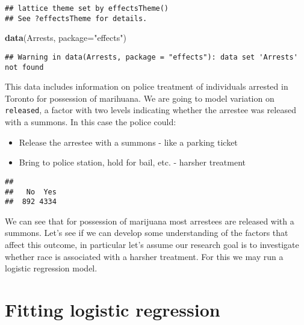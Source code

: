 \documentclass[
]{book}
\newenvironment{Shaded}{\begin{snugshade}}{\end{snugshade}}
\newcommand{\AttributeTok}[1]{\textcolor[rgb]{0.13,0.29,0.53}{#1}}
\newcommand{\FunctionTok}[1]{\textcolor[rgb]{0.13,0.29,0.53}{\textbf{#1}}}
\newcommand{\NormalTok}[1]{#1}
\newcommand{\SpecialCharTok}[1]{\textcolor[rgb]{0.81,0.36,0.00}{\textbf{#1}}}
\newcommand{\StringTok}[1]{\textcolor[rgb]{0.31,0.60,0.02}{#1}}
\begin{document}
\begin{verbatim}
## lattice theme set by effectsTheme()
## See ?effectsTheme for details.
\end{verbatim}

\begin{Shaded}
\begin{Highlighting}[]
\FunctionTok{data}\NormalTok{(Arrests, }\AttributeTok{package=}\StringTok{"effects"}\NormalTok{)}
\end{Highlighting}
\end{Shaded}

\begin{verbatim}
## Warning in data(Arrests, package = "effects"): data set 'Arrests' not found
\end{verbatim}

This data includes information on police treatment of individuals arrested in Toronto for possession of marihuana. We are going to model variation on \texttt{released}, a factor with two levels indicating whether the arrestee was released with a summons. In this case the police could:

\begin{itemize}
\item
  Release the arrestee with a summons - like a parking ticket
\item
  Bring to police station, hold for bail, etc. - harsher treatment
\end{itemize}

\begin{Shaded}
\end{Shaded}

\begin{verbatim}
## 
##   No  Yes 
##  892 4334
\end{verbatim}

We can see that for possession of marijuana most arrestees are released with a summons. Let's see if we can develop some understanding of the factors that affect this outcome, in particular let's assume our research goal is to investigate whether race is associated with a harsher treatment. For this we may run a logistic regression model.

\section{Fitting logistic regression}\label{fitting-logistic-regression}
\end{document}
